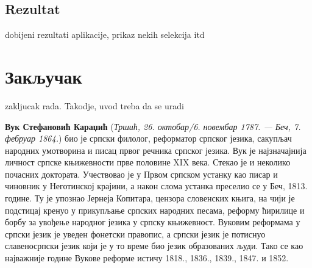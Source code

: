 \documentclass[12pt,oneside]{memoir}
\begin{document}
\section{Rezultat}
\label{sec:rezultat}

dobijeni rezultati aplikacije, prikaz nekih selekcija itd

\chapter{Закључак}
\label{chp:zakljucak}

zakljucak rada. Takodje, uvod treba da se uradi


\literatura

\backmatter

\begin{biografija}
\textbf{Вук Стефановић Караџић} (\emph{Тршић, 26. октобар/6. новембар
  1787. — Беч, 7. фебруар 1864.}) био је српски филолог, реформатор
српског језика, сакупљач народних умотворина и писац првог речника
српског језика.  Вук је најзначајнија личност српске књижевности прве
половине XIX века. Стекао је и неколико почасних доктората.
Учествовао је у Првом српском устанку као писар и чиновник у
Неготинској крајини, а након слома устанка преселио се у Беч,
1813. године. Ту је упознао Јернеја Копитара, цензора словенских
књига, на чији је подстицај кренуо у прикупљање српских народних
песама, реформу ћирилице и борбу за увођење народног језика у српску
књижевност. Вуковим реформама у српски језик је уведен фонетски
правопис, а српски језик је потиснуо славеносрпски језик који је у то
време био језик образованих људи. Тако се као најважније године Вукове
реформе истичу 1818., 1836., 1839., 1847. и 1852.
\end{biografija}
\end{document}
